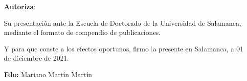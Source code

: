 \bigskip
\textbf{Autoriza}:
\bigskip

Su presentación ante la Escuela de Doctorado de la Universidad de Salamanca, mediante el formato de compendio de publicaciones.  

\bigskip

Y para que conste a los efectos oportunos, firmo la presente en Salamanca, a 01 de diciembre de 2021. 

\bigskip

\bigskip

\bigskip

\bigskip

\bigskip

%
%
%
%


\textbf{Fdo:} Mariano Martín Martín 


%	

